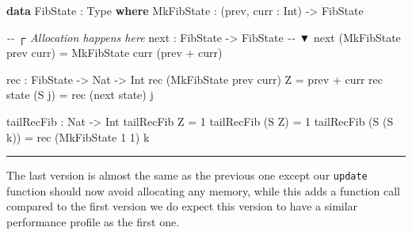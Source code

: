\documentclass[
]{article}
\newenvironment{Shaded}{}{}
\newcommand{\CommentTok}[1]{\textcolor[rgb]{0.38,0.63,0.69}{\textit{#1}}}
\newcommand{\DataTypeTok}[1]{\textcolor[rgb]{0.56,0.13,0.00}{#1}}
\newcommand{\DecValTok}[1]{\textcolor[rgb]{0.25,0.63,0.44}{#1}}
\newcommand{\KeywordTok}[1]{\textcolor[rgb]{0.00,0.44,0.13}{\textbf{#1}}}
\newcommand{\NormalTok}[1]{#1}
\newcommand{\OperatorTok}[1]{\textcolor[rgb]{0.40,0.40,0.40}{#1}}
\newcommand{\OtherTok}[1]{\textcolor[rgb]{0.00,0.44,0.13}{#1}}
\begin{document}
\begin{Shaded}
\begin{Highlighting}[]
\KeywordTok{data} \DataTypeTok{FibState} \OperatorTok{:} \DataTypeTok{Type} \KeywordTok{where}
  \DataTypeTok{MkFibState} \OperatorTok{:}\NormalTok{ (prev, curr }\OperatorTok{:}  \DataTypeTok{Int}\NormalTok{) }\OtherTok{{-}\textgreater{}} \DataTypeTok{FibState}

                            \CommentTok{{-}{-}   ┌ Allocation happens here}
\NormalTok{next }\OperatorTok{:} \DataTypeTok{FibState} \OtherTok{{-}\textgreater{}} \DataTypeTok{FibState} \CommentTok{{-}{-}   ▼}
\NormalTok{next (}\DataTypeTok{MkFibState}\NormalTok{ prev curr) }\OtherTok{=} \DataTypeTok{MkFibState}\NormalTok{ curr (prev }\OperatorTok{+}\NormalTok{ curr)}

\NormalTok{rec }\OperatorTok{:} \DataTypeTok{FibState} \OtherTok{{-}\textgreater{}} \DataTypeTok{Nat} \OtherTok{{-}\textgreater{}} \DataTypeTok{Int}
\NormalTok{rec (}\DataTypeTok{MkFibState}\NormalTok{ prev curr) }\DataTypeTok{Z} \OtherTok{=}\NormalTok{ prev }\OperatorTok{+}\NormalTok{ curr}
\NormalTok{rec state (}\DataTypeTok{S}\NormalTok{ j) }\OtherTok{=}\NormalTok{ rec (next state) j}

\NormalTok{tailRecFib }\OperatorTok{:} \DataTypeTok{Nat} \OtherTok{{-}\textgreater{}} \DataTypeTok{Int}
\NormalTok{tailRecFib }\DataTypeTok{Z} \OtherTok{=} \DecValTok{1}
\NormalTok{tailRecFib (}\DataTypeTok{S} \DataTypeTok{Z}\NormalTok{) }\OtherTok{=} \DecValTok{1}
\NormalTok{tailRecFib (}\DataTypeTok{S}\NormalTok{ (}\DataTypeTok{S}\NormalTok{ k)) }\OtherTok{=}\NormalTok{ rec (}\DataTypeTok{MkFibState} \DecValTok{1} \DecValTok{1}\NormalTok{) k}
\end{Highlighting}
\end{Shaded}

\begin{center}\rule{0.5\linewidth}{0.5pt}\end{center}

The last version is almost the same as the previous one except our
\texttt{update} function should now avoid allocating any memory, while
this adds a function call compared to the first version we do expect
this version to have a similar performance profile as the first one.
\end{document}
